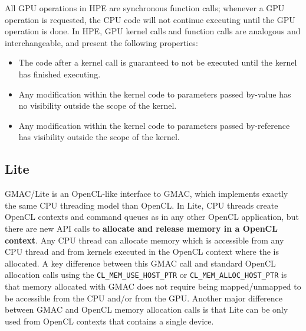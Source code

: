All GPU operations in HPE are synchronous function calls; whenever a GPU operation is requested, the 
CPU code will not continue executing until the GPU operation is done. In HPE, GPU kernel calls and 
function calls are analogous and interchangeable, and present the following properties:
\begin{itemize}
\item The code after a kernel call is guaranteed to not be executed until the kernel has finished 
executing.
\item Any modification within the kernel code to parameters passed by\hyp{}value has no visibility 
outside the scope of the kernel.
\item Any modification within the kernel code to parameters passed by\hyp{}reference has visibility 
outside the scope of the kernel.
\end{itemize}


\subsection{Lite}

GMAC\slash Lite is an OpenCL\hyp{}like interface to GMAC, which implements exactly the same CPU 
threading model than OpenCL\@. In Lite, CPU threads create OpenCL contexts and command queues as in 
any other OpenCL application, but there are new API calls to \textbf{allocate and release memory in 
a OpenCL context}. Any CPU thread can allocate memory which is accessible from any CPU thread and 
from kernels executed in the OpenCL context where the is allocated. A key difference between this 
GMAC call and standard OpenCL allocation calls using the \texttt{CL\_MEM\_USE\_HOST\_PTR} or 
\texttt{CL\_MEM\_ALLOC\_HOST\_PTR} is that memory allocated with GMAC does not require being 
mapped\slash unmapped to be accessible from the CPU and\slash or from the GPU\@. Another major 
difference between GMAC and OpenCL memory allocation calls is that Lite can be only used from OpenCL 
contexts that contains a single device.

